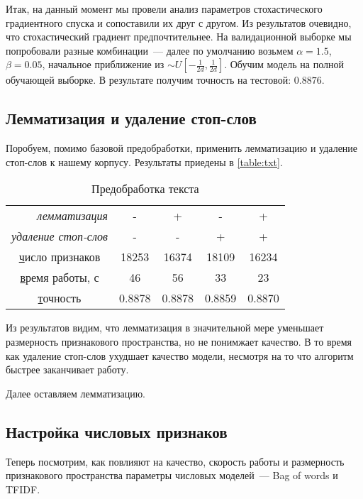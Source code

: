 \documentclass[12pt]{article}
\begin{document}
Итак, на данный момент мы провели анализ параметров стохастического градиентного спуска и сопоставили их друг с другом. Из результатов очевидно, что стохастический градиент предпочтительнее. На валидационной выборке мы попробовали разные комбинации~--- далее по умолчанию возьмем $\alpha=1.5$, $\beta=0.05$, начальное приближение из $\sim U[-\frac{1}{2d},\frac{1}{2d}]$. Обучим модель на полной обучающей выборке. В результате получим точность на тестовой: $0.8876$.

\subsection{Лемматизация и удаление стоп-слов}

Поробуем, помимо базовой предобработки, применить лемматизацию и удаление стоп-слов к нашему корпусу. Результаты приедены в \autoref{table:txt}.
\begin{table}[h!]
    \centering
    \begin{tabular}{@{}ccccc@{}}
    \toprule
    \multicolumn{1}{r}{\textit{лемматизация}} & - & + & - & + \\ 
    \multicolumn{1}{r}{\textit{удаление стоп-слов}} & - & - & + & + \\ \midrule
    {\ul число признаков} & 18253 & 16374 & 18109 & 16234 \\
    {\ul время работы, с} & 46 & 56 & 33 & 23 \\
    {\ul точность} & 0.8878 & 0.8878 & 0.8859 & 0.8870 \\ \bottomrule
    \end{tabular}
    \caption{Предобработка текста}
    \label{table:txt}
\end{table}

Из результатов видим, что лемматизация в значительной мере уменьшает размерность признакового пространства, но не понимжает качество. В то время как удаление стоп-слов ухудшает качество модели, несмотря на то что алгоритм быстрее заканчивает работу.

Далее оставляем лемматизацию.

\subsection{Настройка числовых признаков}

Теперь посмотрим, как повлияют на качество, скорость работы и размерность признакового пространства параметры числовых моделей~--- Bag of words и TFIDF.
\end{document}
